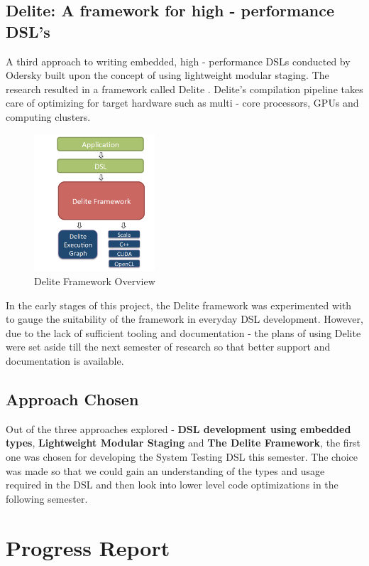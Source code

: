 \documentclass[12 pt]{article}
\begin{document}
\subsection{Delite: A framework for high - performance DSL's}
A third approach to writing embedded, high - performance DSLs conducted by Odersky built upon the concept of using lightweight modular staging. The research resulted in a framework called Delite \cite{delite}. Delite's compilation pipeline takes care of optimizing for target hardware such as multi - core processors, GPUs and computing clusters.

\begin{figure}[h!]
  \centering
    \includegraphics[width=170px]{figures/delite.png}
  \caption{Delite Framework Overview}
\end{figure}

\noindent
In the early stages of this project, the Delite framework was experimented with to gauge the suitability of the framework in everyday DSL development. However, due to the lack of sufficient tooling and documentation - the plans of using Delite were set aside till the next semester of research so that better support and documentation is available.
\bigskip

\subsection{Approach Chosen}
Out of the three approaches explored - \textbf{DSL development using embedded types}, \textbf{Lightweight Modular Staging} and \textbf{The Delite Framework}, the first one was chosen for developing the System Testing DSL this semester. The choice was made so that we could gain an understanding of the types and usage required in the DSL and then look into lower level code optimizations in the following semester.
\newpage

\section{Progress Report}
\end{document}
